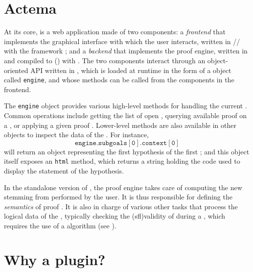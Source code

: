 \section{Actema}

\AP At its core,  is a web application made of two components: a
\emph{frontend} that implements the graphical interface with which the user
interacts, written in // with the
 framework \cite{Vuejs}; and a \emph{backend} that implements the
proof engine, written in  and compiled to  ()
with  . The two components
interact through an object-oriented API written in , which is loaded
at runtime in the form of a  object called \texttt{engine}, and whose
methods can be called from the  components in the frontend.

The \texttt{engine} object provides various high-level methods for handling the
current \emph{}. Common operations include getting the list of open
, querying available proof  on a , or applying a given
proof . Lower-level methods are also available in other objects to inspect
the data of the . For instance,
$$\mathtt{engine.subgoals[0].context[0]}$$ will return an object representing
the first hypothesis of the first ; and this object itself exposes
an \texttt{html} method, which returns a string holding the  code used to
display the statement of the hypothesis.

In the standalone version of , the proof engine takes care of
computing the new  stemming from  performed by the user. It
is thus responsible for defining the \emph{semantics} of proof . It is
also in charge of various other tasks that process the logical data of the
, typically checking the \kl(sfl){validity} of 
during a  , which requires the use of a  algorithm
(see ).

\section{Why a plugin?}

